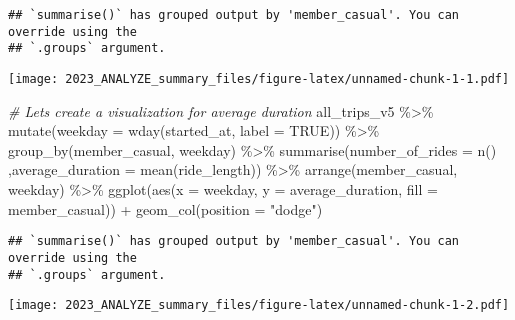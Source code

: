 \documentclass[
]{article}
\newenvironment{Shaded}{\begin{snugshade}}{\end{snugshade}}
\newcommand{\AttributeTok}[1]{\textcolor[rgb]{0.77,0.63,0.00}{#1}}
\newcommand{\CommentTok}[1]{\textcolor[rgb]{0.56,0.35,0.01}{\textit{#1}}}
\newcommand{\ConstantTok}[1]{\textcolor[rgb]{0.00,0.00,0.00}{#1}}
\newcommand{\FunctionTok}[1]{\textcolor[rgb]{0.00,0.00,0.00}{#1}}
\newcommand{\NormalTok}[1]{#1}
\newcommand{\SpecialCharTok}[1]{\textcolor[rgb]{0.00,0.00,0.00}{#1}}
\newcommand{\StringTok}[1]{\textcolor[rgb]{0.31,0.60,0.02}{#1}}
\begin{document}
\begin{verbatim}
## `summarise()` has grouped output by 'member_casual'. You can override using the
## `.groups` argument.
\end{verbatim}

\texttt{[image: 2023\_ANALYZE\_summary\_files/figure-latex/unnamed-chunk-1-1.pdf]}

\begin{Shaded}
\begin{Highlighting}[]
\CommentTok{\# Let\textquotesingle{}s create a visualization for average duration}
\NormalTok{all\_trips\_v5 }\SpecialCharTok{\%\textgreater{}\%} 
  \FunctionTok{mutate}\NormalTok{(}\AttributeTok{weekday =} \FunctionTok{wday}\NormalTok{(started\_at, }\AttributeTok{label =} \ConstantTok{TRUE}\NormalTok{)) }\SpecialCharTok{\%\textgreater{}\%} 
  \FunctionTok{group\_by}\NormalTok{(member\_casual, weekday) }\SpecialCharTok{\%\textgreater{}\%} 
  \FunctionTok{summarise}\NormalTok{(}\AttributeTok{number\_of\_rides =} \FunctionTok{n}\NormalTok{()}
\NormalTok{            ,}\AttributeTok{average\_duration =} \FunctionTok{mean}\NormalTok{(ride\_length)) }\SpecialCharTok{\%\textgreater{}\%} 
  \FunctionTok{arrange}\NormalTok{(member\_casual, weekday)  }\SpecialCharTok{\%\textgreater{}\%} 
  \FunctionTok{ggplot}\NormalTok{(}\FunctionTok{aes}\NormalTok{(}\AttributeTok{x =}\NormalTok{ weekday, }\AttributeTok{y =}\NormalTok{ average\_duration, }\AttributeTok{fill =}\NormalTok{ member\_casual)) }\SpecialCharTok{+}
  \FunctionTok{geom\_col}\NormalTok{(}\AttributeTok{position =} \StringTok{"dodge"}\NormalTok{)}
\end{Highlighting}
\end{Shaded}

\begin{verbatim}
## `summarise()` has grouped output by 'member_casual'. You can override using the
## `.groups` argument.
\end{verbatim}

\texttt{[image: 2023\_ANALYZE\_summary\_files/figure-latex/unnamed-chunk-1-2.pdf]}

\begin{Shaded}
\end{Shaded}
\end{document}
